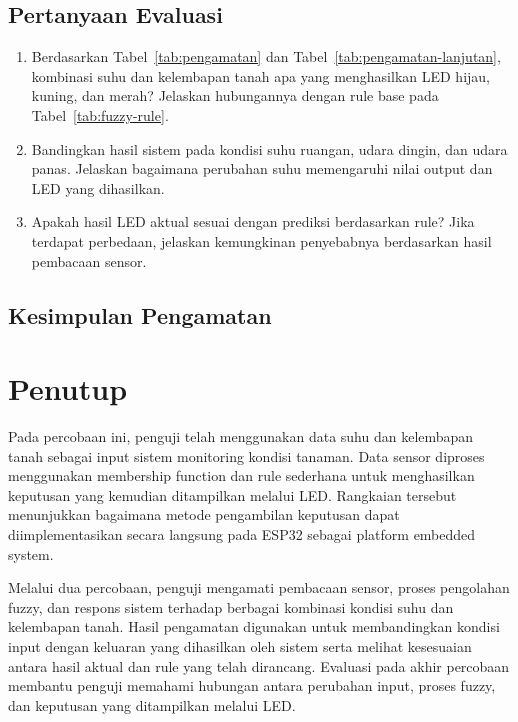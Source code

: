 \documentclass[12pt,a4paper]{article}
\begin{document}
\subsection*{Pertanyaan Evaluasi}

\begin{enumerate}
    \item Berdasarkan Tabel~\ref{tab:pengamatan} dan Tabel~\ref{tab:pengamatan-lanjutan}, kombinasi suhu dan kelembapan tanah apa yang menghasilkan LED hijau, kuning, dan merah? Jelaskan hubungannya dengan rule base pada Tabel~\ref{tab:fuzzy-rule}.

    \item Bandingkan hasil sistem pada kondisi suhu ruangan, udara dingin, dan udara panas. Jelaskan bagaimana perubahan suhu memengaruhi nilai output dan LED yang dihasilkan.

    \item Apakah hasil LED aktual sesuai dengan prediksi berdasarkan rule? Jika terdapat perbedaan, jelaskan kemungkinan penyebabnya berdasarkan hasil pembacaan sensor.
\end{enumerate}

\subsection*{Kesimpulan Pengamatan}

\noindent
\makebox[\textwidth]{\hrulefill}

\vspace{0.4cm}

\noindent
\makebox[\textwidth]{\hrulefill}

\vspace{0.4cm}

\noindent
\makebox[\textwidth]{\hrulefill}

\section{Penutup}

Pada percobaan ini, penguji telah menggunakan data suhu dan kelembapan tanah sebagai input sistem monitoring kondisi tanaman. Data sensor diproses menggunakan membership function dan rule sederhana untuk menghasilkan keputusan yang kemudian ditampilkan melalui LED. Rangkaian tersebut menunjukkan bagaimana metode pengambilan keputusan dapat diimplementasikan secara langsung pada ESP32 sebagai platform embedded system.

Melalui dua percobaan, penguji mengamati pembacaan sensor, proses pengolahan fuzzy, dan respons sistem terhadap berbagai kombinasi kondisi suhu dan kelembapan tanah. Hasil pengamatan digunakan untuk membandingkan kondisi input dengan keluaran yang dihasilkan oleh sistem serta melihat kesesuaian antara hasil aktual dan rule yang telah dirancang. Evaluasi pada akhir percobaan membantu penguji memahami hubungan antara perubahan input, proses fuzzy, dan keputusan yang ditampilkan melalui LED.
\end{document}
